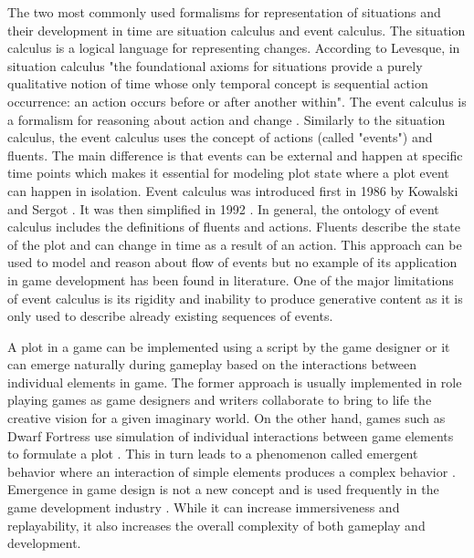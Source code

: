 The two most commonly used formalisms for representation of situations and their development in time are situation calculus and event calculus.
The situation calculus is a logical language for representing changes\cite{lin2008situation}.
According to Levesque, in situation calculus "the foundational axioms for situations provide a purely qualitative notion of time whose only temporal concept is sequential action occurrence: an action occurs before or after another within"\cite{levesque1998foundations}.
The event calculus is a formalism for reasoning about action and change \cite{mueller2008event}.
Similarly to the situation calculus, the event calculus uses the concept of actions (called "events") and fluents.
The main difference is that events can be external and happen at specific time points which makes it essential for modeling plot state where a plot event can happen in isolation.
Event calculus was introduced first in 1986 by Kowalski and Sergot \cite{kowalski1986logic}.
It was then simplified in 1992 \cite{kakas1992abductive}.
In general, the ontology of event calculus includes the definitions of fluents and actions.
Fluents describe the state of the plot and can change in time as a result of an action.
This approach can be used to model and reason about flow of events but no example of its application in game development has been found in literature.
One of the major limitations of event calculus is its rigidity and inability to produce generative content as it is only used to describe already existing sequences of events.

A plot in a game can be implemented using a script by the game designer or it can emerge naturally during gameplay based on the interactions between individual elements in game.
The former approach is usually implemented in role playing games as game designers and writers collaborate to bring to life the creative vision for a given imaginary world.
On the other hand, games such as Dwarf Fortress use simulation of individual interactions between game elements to formulate a plot \cite{adams2015simulation}.
This in turn leads to a phenomenon called emergent behavior where an interaction of simple elements produces a complex behavior \cite{adams2019emergent}.
Emergence in game design is not a new concept and is used frequently in the game development industry \cite{sweetser2008emergence}.
While it can increase immersiveness and replayability, it also increases the overall complexity of both gameplay and development.


